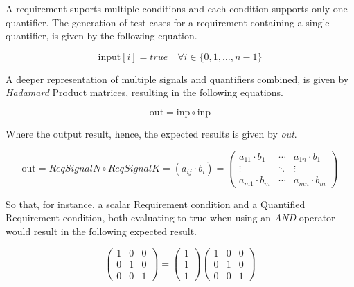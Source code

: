 A requirement suports multiple conditions and each condition supports only one quantifier.
The generation of test cases for a requirement containing a single quantifier, is given by the following equation.

\begin{equation}
    \text{input}[i] = true \quad \forall i \in \{0, 1, \dots , n-1\}
\end{equation}
\label{eq1}

A deeper representation of multiple signals and quantifiers combined, is given by \textit{Hadamard} Product matrices, resulting in the following equations.


\begin{equation}
    \text{out} = \text{inp} \circ \text{inp}
\end{equation}
\label{eq2}

Where the output result, hence, the expected results is given by \textit{out}.

\begin{equation}
\text{out} = ReqSignalN \circ ReqSignalK = (a_{ij}\cdot b_i) = 
\begin{pmatrix} 
a_{11} \cdot b_{1} & \cdots & a_{1n} \cdot b_{1} \\
\vdots & \ddots & \vdots \\ 
a_{m1} \cdot b_{m} & \cdots & a_{mn} \cdot b_{m} 
\end{pmatrix}
\end{equation}

So that, for instance, a scalar Requirement condition and a Quantified Requirement condition, both evaluating to true when using an \textit{AND} operator would result in the following expected result.

\begin{equation}
\begin{pmatrix}
1 & 0 & 0\\
0 & 1 & 0\\
0 & 0 & 1
\end{pmatrix} = 
\begin{pmatrix}
1\\
1\\
1 
\end{pmatrix} 
\begin{pmatrix}
1 & 0 & 0\\
0 & 1 & 0\\
0 & 0 & 1
\end{pmatrix} 
\end{equation}\\

